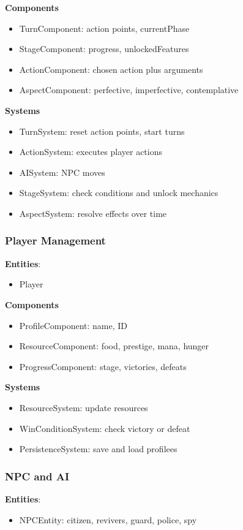 \documentclass[11pt]{article}
\begin{document}
\textbf{Components}
\begin{itemize}
\item
  TurnComponent: action points, currentPhase
\item
  StageComponent: progress, unlockedFeatures
\item
  ActionComponent: chosen action plus arguments
\item
  AspectComponent: perfective, imperfective, contemplative
\end{itemize}

\textbf{Systems}
\begin{itemize}
\item
  TurnSystem: reset action points, start turns
\item
  ActionSystem: executes player actions
\item
  AISystem: NPC moves
\item
  StageSystem: check conditions and unlock mechanics
\item
  AspectSystem: resolve effects over time
\end{itemize}

\subsubsection{Player Management}
\textbf{Entities}:
\begin{itemize}
\item
  Player
\end{itemize}

\textbf{Components}
\begin{itemize}
\item
  ProfileComponent: name, ID
\item
  ResourceComponent: food, prestige, mana, hunger
\item
  ProgressComponent: stage, victories, defeats
\end{itemize}

\textbf{Systems}
\begin{itemize}
\item
  ResourceSystem: update resources
\item
  WinConditionSystem: check victory or defeat
\item
  PersistenceSystem: save and load profilees
\end{itemize}

\subsubsection{NPC and AI}
\textbf{Entities}:
\begin{itemize}
\item
  NPCEntity: citizen, revivers, guard, police, spy
\end{itemize}
\end{document}
